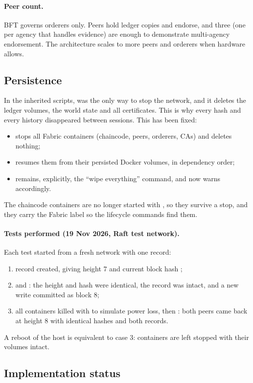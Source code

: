 \paragraph{Peer count.} BFT governs orderers only. Peers hold ledger copies and endorse, and three (one per agency that handles evidence) are enough to demonstrate multi-agency endorsement. The architecture scales to more peers and orderers when hardware allows.

\subsection{Persistence}
\label{sec:persistence}
In the inherited scripts,  was the only way to stop the network, and it deletes the ledger volumes, the world state and all certificates. This is why every hash and every history disappeared between sessions. This has been fixed:
\begin{itemize}
  \item {} stops all Fabric containers (chaincode, peers, orderers, CAs) and deletes nothing;
  \item {} resumes them from their persisted Docker volumes, in dependency order;
  \item {} remains, explicitly, the \enquote{wipe everything} command, and now warns accordingly.
\end{itemize}
The chaincode containers are no longer started with , so they survive a stop, and they carry the Fabric label so the lifecycle commands find them.

\paragraph{Tests performed (19 Nov 2026, Raft test network).} Each test started from a fresh network with one record:
\begin{enumerate}[nosep]
  \item record created, giving height 7 and current block hash ;
  \item {} and : the height and hash were identical, the record was intact, and a new write committed as block 8;
  \item all containers killed with  to simulate power loss, then : both peers came back at height 8 with identical hashes and both records.
\end{enumerate}
A reboot of the host is equivalent to case 3: containers are left stopped with their volumes intact.

\subsection{Implementation status}
\label{sec:netstatus}

